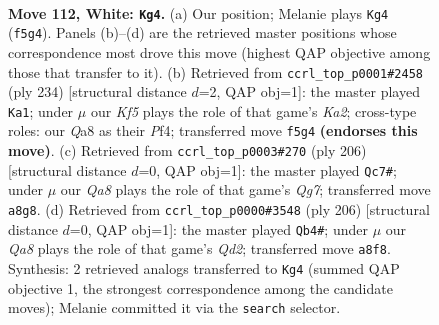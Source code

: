 \documentclass[11pt]{article}
\begin{document}
\clearpage

\begin{figure}[p]\centering
\begin{subfigure}{0.46\textwidth}\centering
\resizebox{\linewidth}{!}{%
\newchessgame
\chessboard[
  setfen={Q7/5k2/8/5K2/8/8/8/8 w - - 3 112},
  showmover=false,
  pgfstyle=straightmove, color=movearrow, markmove={f5-g4}
]}
\caption{}
\end{subfigure}\hfill
\begin{subfigure}{0.46\textwidth}\centering
\resizebox{\linewidth}{!}{%
\newchessgame
\chessboard[
  setfen={8/8/8/8/1k3P2/8/K7/8 w - - 6 118},
  showmover=false,
  pgfstyle=straightmove, color=movearrow, markmove={a2-a1}
]}
\caption{}
\end{subfigure}
\\[4pt]
\begin{subfigure}{0.46\textwidth}\centering
\resizebox{\linewidth}{!}{%
\newchessgame
\chessboard[
  setfen={2k5/6Q1/3K4/8/8/8/8/8 w - - 9 104},
  showmover=false,
  pgfstyle=straightmove, color=movearrow, markmove={g7-c7}
]}
\caption{}
\end{subfigure}\hfill
\begin{subfigure}{0.46\textwidth}\centering
\resizebox{\linewidth}{!}{%
\newchessgame
\chessboard[
  setfen={8/8/8/8/k1K5/8/3Q4/8 w - - 8 104},
  showmover=false,
  pgfstyle=straightmove, color=movearrow, markmove={d2-b4}
]}
\caption{}
\end{subfigure}
\caption{\textbf{Move 112, White: \texttt{Kg4}.} (a) Our position; Melanie plays \texttt{Kg4} (\texttt{f5g4}). Panels (b)--(d) are the retrieved master positions whose correspondence most drove this move (highest QAP objective among those that transfer to it). (b) Retrieved from \texttt{ccrl\_top\_p0001\#2458} (ply 234) [structural distance $d$=2, QAP obj=1]: the master played \texttt{Ka1}; under $\mu$ our \emph{Kf5} plays the role of that game's \emph{Ka2}; cross-type roles: our \emph{Q}a8 as their \emph{P}f4; transferred move \texttt{f5g4} \textbf{(endorses this move)}. (c) Retrieved from \texttt{ccrl\_top\_p0003\#270} (ply 206) [structural distance $d$=0, QAP obj=1]: the master played \texttt{Qc7\#}; under $\mu$ our \emph{Qa8} plays the role of that game's \emph{Qg7}; transferred move \texttt{a8g8}. (d) Retrieved from \texttt{ccrl\_top\_p0000\#3548} (ply 206) [structural distance $d$=0, QAP obj=1]: the master played \texttt{Qb4\#}; under $\mu$ our \emph{Qa8} plays the role of that game's \emph{Qd2}; transferred move \texttt{a8f8}. Synthesis: 2 retrieved analogs transferred to \texttt{Kg4} (summed QAP objective 1, the strongest correspondence among the candidate moves); Melanie committed it via the \texttt{search} selector.}
\label{fig:thought-m222}
\end{figure}
\end{document}
